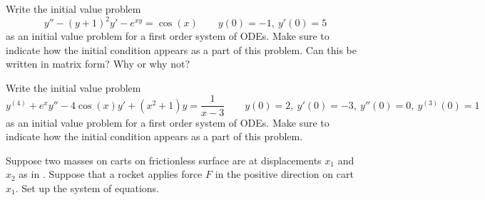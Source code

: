 \documentclass{ximera}
\begin{document}
\begin{exercise}
    Write the initial value problem 
    \[ 
        y'' - (y+1)^2 y' - e^{xy} = \cos(x) \qquad y(0) = -1,\ y'(0) = 5 
    \] 
    as an initial value problem for a first order system of ODEs. Make sure to indicate how the initial condition appears as a part of this problem. Can this be written in matrix form? Why or why not?
\end{exercise}

\begin{exercise}
    Write the initial value problem 
    \[ 
        y^{(4)} + e^x y'' - 4\cos(x)y' + (x^2 + 1)y = \frac{1}{x-3} \qquad y(0) = 2,\ y'(0) = -3,\ y''(0) = 0,\ y^{(3)}(0) = 1 
    \] 
    as an initial value problem for a first order system of ODEs. Make sure to indicate how the initial condition appears as a part of this problem. 
\end{exercise}

\begin{exercise}
    Suppose two masses on carts on frictionless surface are at displacements $x_1$ and $x_2$ as in . Suppose that a rocket applies force $F$ in the positive direction on cart $x_1$.  Set up the system of equations.
\end{exercise}
\end{document}
